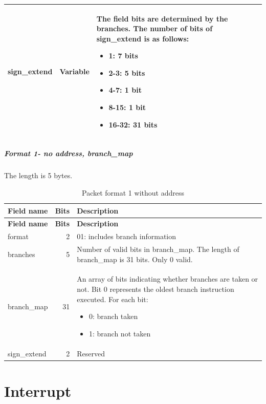 \documentclass[main\_\_EN.tex]{subfiles}
\begin{document}
\begin{longtable}[c]{ |l|r|L{11cm}| }
    sign\_extend & Variable & The field bits are determined by the branches. The number of bits of sign\_extend is as follows:
    \begin{itemize}
        \item 1: 7 bits
        \item 2-3: 5 bits
        \item 4-7: 1 bit
        \item 8-15: 1 bit
        \item 16-32: 31 bits
    \vspace{-1.5em}
    \end{itemize}
    \\\hline
 \end{longtable}

 \subparagraph{Format 1- no address, branch\_map}
 The length is 5 bytes.
\begin{longtable}[c]{ |l|r|L{11cm}| }
    \caption{Packet format 1 without address}
    \label{tab:f1}
    \\\hline{}
    \textbf{Field name} & \textbf{Bits} & \textbf{Description} \\\hline
    \endfirsthead
    \textbf{Field name} & \textbf{Bits} & \textbf{Description} \\\hline
    \endhead
    \endfoot
    \endlastfoot

    format & 2 & 01: includes branch information \\\hline
    branches & 5 & Number of valid bits in branch\_map. The length of branch\_map is 31 bits. Only 0 valid. \\\hline

    branch\_map & 31 & An array of bits indicating whether branches are taken or not. Bit 0 represents the oldest branch instruction executed. For each bit:
    \begin{itemize}
        \item 0: branch taken
        \item 1: branch not taken
    \vspace{-1.5em}
    \end{itemize}
    \\\hline

    sign\_extend & 2 & Reserved \\\hline
 \end{longtable}


\section{Interrupt}
\end{document}
